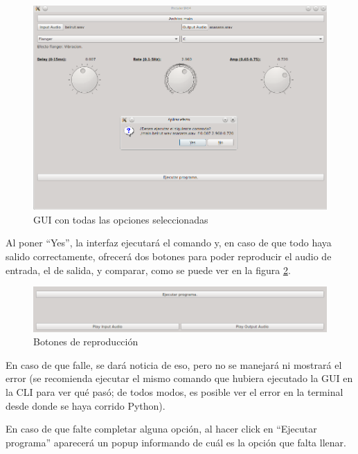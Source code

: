 \begin{figure}[H]
    \centering
    \includegraphics[scale=0.68]{imagenes/gui-complete.png}
    \caption{GUI con todas las opciones seleccionadas}
    \label{fig:gui-complete}
\end{figure}

\begin{center}
\end{center}\vspace{\baselineskip}

Al poner ``Yes'', la interfaz ejecutará el comando y, en caso de que todo haya salido correctamente, ofrecerá dos botones para poder reproducir el audio de entrada, el de salida, y comparar, como se puede ver en la figura \ref{fig:gui-play-buttons}.

\begin{figure}[H]
    \centering
    \includegraphics[scale=0.68]{imagenes/gui-play-buttons.png}
    \caption{Botones de reproducción}
    \label{fig:gui-play-buttons}
\end{figure}

En caso de que falle, se dará noticia de eso, pero no se manejará ni mostrará el error (se recomienda ejecutar el mismo comando que hubiera ejecutado la GUI en la CLI para ver qué pasó; de todos modos, es posible ver el error en la terminal desde donde se haya corrido Python).

En caso de que falte completar alguna opción, al hacer click en ``Ejecutar programa'' aparecerá un popup informando de cuál es la opción que falta llenar. 
